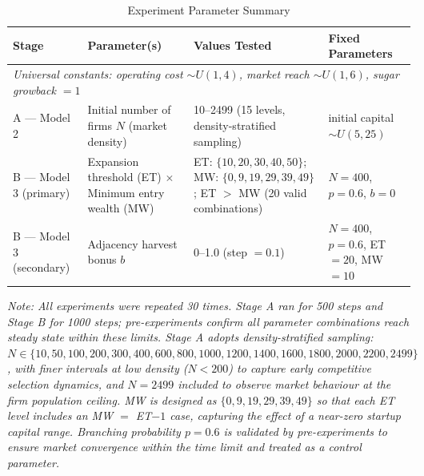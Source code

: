 \documentclass{article}
\begin{document}
\begin{table}[H]
\begin{threeparttable}
\centering
\caption{Experiment Parameter Summary}
\begin{tabularx}{\textwidth}{lXXX}
\toprule
\textbf{Stage} & \textbf{Parameter(s)} & \textbf{Values Tested} & \textbf{Fixed Parameters} \\
\midrule
\multicolumn{4}{l}{\textit{Universal constants: operating cost $\sim U(1,4)$, market reach $\sim U(1,6)$, sugar growback $= 1$}} \\
\midrule
A --- Model 2 & Initial number of firms $N$ (market density) & 10--2499 (15 levels, density-stratified sampling) & initial capital $\sim U(5,25)$ \\
\addlinespace
B --- Model 3 (primary) & Expansion threshold (ET) $\times$ Minimum entry wealth (MW) & ET: $\{10,20,30,40,50\}$; MW: $\{0,9,19,29,39,49\}$; ET $>$ MW (20 valid combinations) & $N=400$, $p=0.6$, $b=0$ \\
\addlinespace
B --- Model 3 (secondary) & Adjacency harvest bonus $b$ & 0--1.0 (step $= 0.1$) & $N=400$, $p=0.6$, ET $=20$, MW $=10$ \\
\bottomrule
\end{tabularx}
\begin{tablenotes}
\small
\item \parbox{\dimexpr\textwidth-2em}{\textit{Note: All experiments were repeated 30 times. Stage A ran for 500 steps and Stage B for 1000 steps; pre-experiments confirm all parameter combinations reach steady state within these limits. Stage A adopts density-stratified sampling: $N \in \{10, 50, 100, 200, 300, 400, 600, 800, 1000, 1200, 1400, 1600, 1800, 2000, 2200, 2499\}$, with finer intervals at low density ($N < 200$) to capture early competitive selection dynamics, and $N = 2499$ included to observe market behaviour at the firm population ceiling. MW is designed as $\{0, 9, 19, 29, 39, 49\}$ so that each ET level includes an MW $=$ ET$-1$ case, capturing the effect of a near-zero startup capital range. Branching probability $p = 0.6$ is validated by pre-experiments to ensure market convergence within the time limit and treated as a control parameter.}}
\end{tablenotes}
\end{threeparttable}
\end{table}



\end{document}
